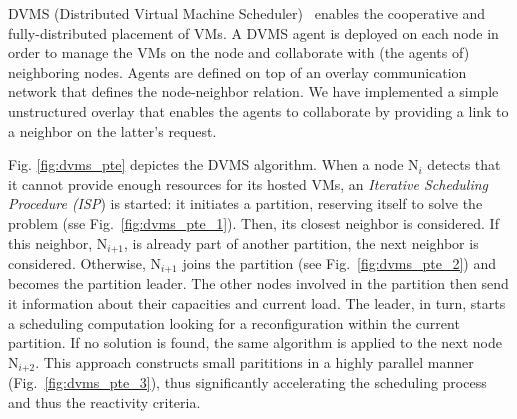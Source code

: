 DVMS (Distributed Virtual Machine Scheduler)~\cite{quesnel:cpe2012} enables the
cooperative and fully-distributed placement of
VMs. A DVMS agent is deployed on each node in order to manage the VMs on
the node and collaborate with (the agents of) neighboring nodes.
Agents are defined on top of an overlay communication network that
defines the node-neighbor relation.
We have implemented a simple %
unstructured overlay that enables the agents to collaborate
by providing a link to a neighbor %
on the latter's request.





Fig. \ref{fig:dvms_pte} depictes the DVMS algorithm.
When a node N\(_{\textit{i}}\) detects that it cannot provide enough
resources for its hosted VMs, %
an \emph{Iterative Scheduling Procedure
  (ISP}) is started:
%
it initiates a partition, reserving itself to solve the problem (sse
Fig.~\ref{fig:dvms_pte_1}).
Then, its
closest neighbor %
is considered.
%
%
%
If this neighbor, N\(_{\textit{i+1}}\),
is already part of another partition, the next neighbor is considered.
Otherwise, N\(_{\textit{i+1}}\)
joins the partition (see Fig.~\ref{fig:dvms_pte_2}) and becomes the
partition leader.
%
The other nodes involved in the partition then send it information about their
capacities and current load. The leader, in turn, starts a scheduling
computation looking for a reconfiguration within the current
partition. If no solution is found, the same algorithm is applied to
the next node N\(_{\textit{i+2}}\).
%
This approach constructs small parititions in a highly parallel
manner (Fig.~\ref{fig:dvms_pte_3}), thus significantly accelerating
the scheduling process and thus the reactivity criteria.

